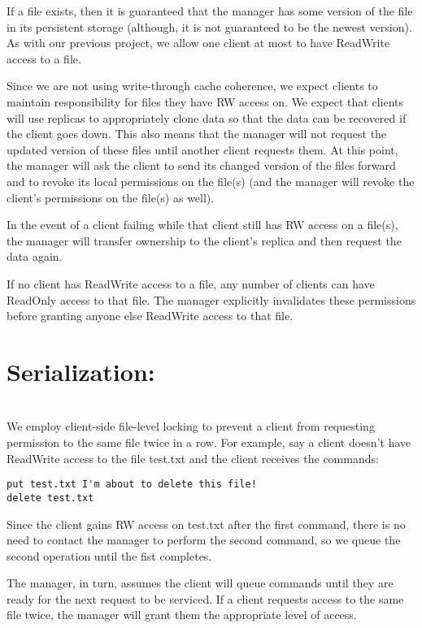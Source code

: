 \documentclass[11pt]{article}
\begin{document}
If a file exists, then it is guaranteed that the manager has some version of the file in its persistent storage (although, it is not guaranteed to be the newest version). 
As with our previous project, we allow one client at most to have ReadWrite access to a file. 

Since we are not using write-through cache coherence, we expect clients to maintain responsibility for files they have RW access on. 
We expect that clients will use replicas to appropriately clone data so that the data can be recovered if the client goes down. This
also means that the manager will not request the updated version of these files until another client requests them. At this point,
the manager will ask the client to send its changed version of the files forward and to revoke its local permissions on the file(s) (and
the manager will revoke the client's permissions on the file(s) as well).

In the event of a client failing while that client still has RW access on a file(s), the manager will transfer ownership to the client's
replica and then request the data again.

If no client has ReadWrite access to a file, any number of clients can have ReadOnly access to that file. The manager explicitly invalidates these permissions before granting anyone else ReadWrite access to that file. \\

\section{Serialization:} \\

We employ client-side file-level locking to prevent a client from requesting permission to the same file twice in a row.
For example, say a client doesn't have ReadWrite access to the file test.txt and the client receives the commands:

\begin{verbatim}
put test.txt I'm about to delete this file!
delete test.txt
\end{verbatim}

Since the client gains RW access on test.txt after the first command, there is no need to contact the manager to perform the second command, so we queue the second operation until the fist completes.

The manager, in turn, assumes the client will queue commands until they are ready for the next request to be serviced. 
If a client requests access to the same file twice, the manager will grant them the appropriate level of access. \\
\end{document}
